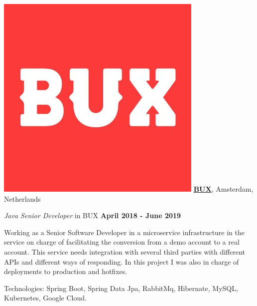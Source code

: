 \includegraphics[scale=0.1]{companies/bux} \href{https://www.getbux.com/}{\textbf{BUX}},
Amsterdam, Netherlands
\begin{outerlist}
\item[] \textit{Java Senior Developer} in BUX%
        \hfill \textbf{April 2018 - June 2019}

Working as a Senior Software Developer in a microservice infrastructure in the service on charge of facilitating the conversion from a demo account to a real account. 
This service needs integration with several third parties with different APIs and different ways of responding. In this project I was also in charge of deployments to production and hotfixes.
\begin{innerlist}
\item Technologies: Spring Boot, Spring Data Jpa, RabbitMq, Hibernate, MySQL, Kubernetes, Google Cloud.
\end{innerlist}
\end{outerlist}

